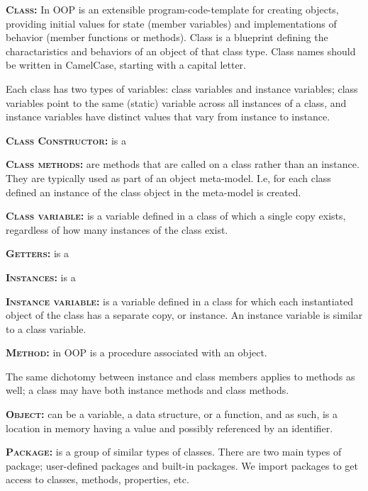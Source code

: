 \documentclass[11pt,a4paper]{article}
\begin{document}
\smallskip \smallskip
\noindent \textbf{\textsc{Class:}} In OOP is an extensible
program-code-template for creating objects, providing initial values
for state (member variables) and implementations of behavior (member
functions or methods). Class is a blueprint defining the
charactaristics and behaviors of an object of that class type. Class
names should be written in CamelCase, starting with a capital letter.

\noindent
Each class has two types of variables: class variables and instance variables; class variables point to the same (static) variable across all instances of a class, and instance variables have distinct values that vary from instance to instance. 

\smallskip  \smallskip
\noindent
\textbf{\textsc{Class Constructor:}} is a 

\smallskip \smallskip
\noindent
\textbf{\textsc{Class methods:}} are methods that are called on a
class rather than an instance. They are typically used as part of an
object meta-model. I.e, for each class defined an instance of the
class object in the meta-model is created.

\smallskip \smallskip
\noindent \textbf{\textsc{Class variable:}} is a variable defined in a
class of which a single copy exists, regardless of how many instances
of the class exist.

\smallskip \smallskip
\noindent
\textbf{\textsc{Getters:}} is a 

\smallskip
\noindent
\textbf{\textsc{Instances:}} is a 

\smallskip \smallskip
\noindent \textbf{\textsc{Instance variable:}} is a variable defined
in a class for which each instantiated object of the class has a
separate copy, or instance. An instance variable is similar to a class
variable.

\smallskip \smallskip
\noindent \textbf{\textsc{Method:}} in OOP is a procedure associated
with an object.

\noindent 
The same dichotomy between instance and class members applies to
methods as well; a class may have both instance methods and class
methods.

\smallskip \smallskip
\noindent \textbf{\textsc{Object:}} can be a variable, a data
structure, or a function, and as such, is a location in memory having
a value and possibly referenced by an identifier.

\smallskip \smallskip
\noindent \textbf{\textsc{Package:}} is a group of similar types of
classes. There are two main types of package; user-defined packages
and built-in packages. We import packages to get access to classes, 
methods, properties, etc. 
\end{document}
